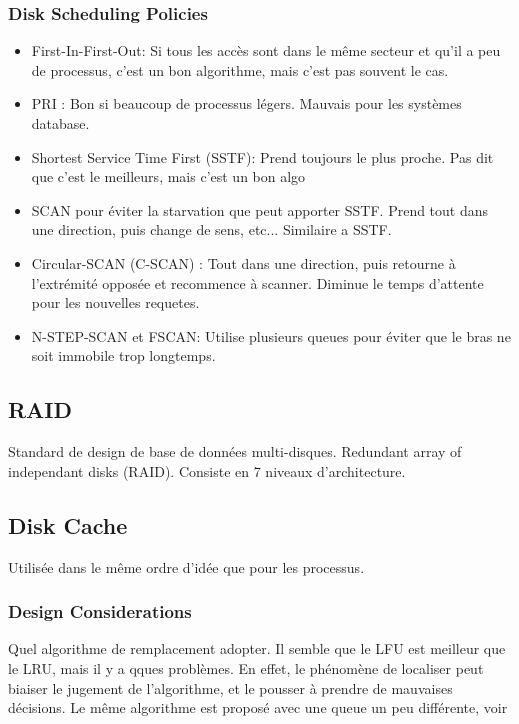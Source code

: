 \subsubsection{Disk Scheduling Policies}
\begin{itemize}
  \item First-In-First-Out: Si tous les accès sont dans le même secteur et qu'il a peu de processus, c'est un bon algorithme, mais c'est pas souvent le cas.
  \item PRI : Bon si beaucoup de processus légers.
    Mauvais pour les systèmes database.
  \item Shortest Service Time First (SSTF): Prend toujours le plus proche.
    Pas dit que c'est le meilleurs, mais c'est un bon algo
  \item SCAN pour éviter la starvation que peut apporter SSTF.
    Prend tout dans une direction, puis change de sens, etc...
    Similaire a SSTF.
  \item Circular-SCAN (C-SCAN) : Tout dans une direction, puis retourne à l'extrémité opposée et recommence à scanner.
    Diminue le temps d'attente pour les nouvelles requetes.
  \item N-STEP-SCAN et FSCAN: Utilise plusieurs queues pour éviter que le bras ne soit immobile trop longtemps.
\end{itemize}

\subsection{RAID}
Standard de design de base de données multi-disques.
Redundant array of independant disks (RAID).
Consiste en 7 niveaux d'architecture.

\subsection{Disk Cache}
Utilisée dans le même ordre d'idée que pour les processus.

\subsubsection{Design Considerations}
Quel algorithme de remplacement adopter.
Il semble que le LFU est meilleur que le LRU, mais il y a qques problèmes.
En effet, le phénomène de localiser peut biaiser le jugement de l'algorithme, et le pousser à prendre de mauvaises décisions.
Le même algorithme est proposé avec une queue un peu différente, voir \cite[p.~524]{stallings}


